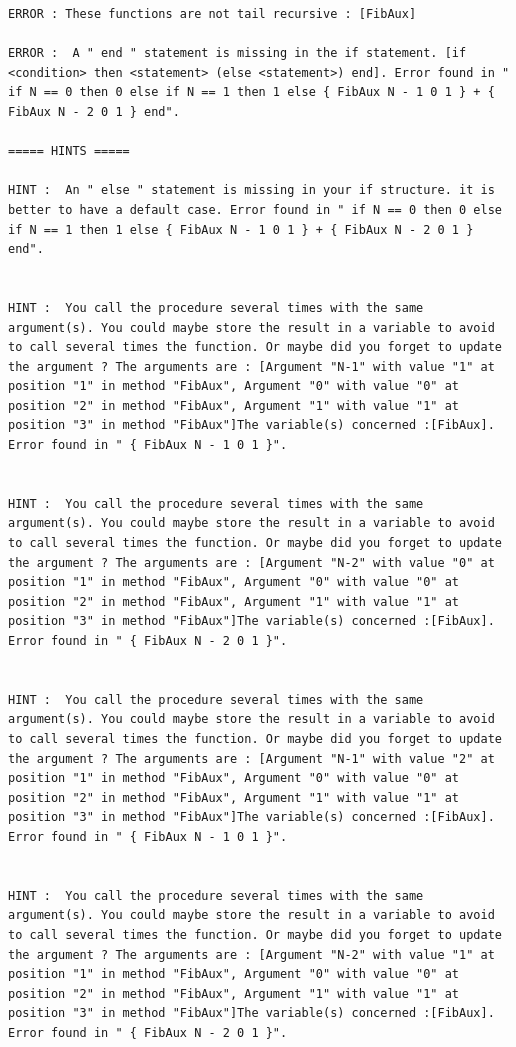 \documentclass[11pt,a4paper,twoside,openright]{report}
\begin{document}
\begin{lstlisting}
ERROR : These functions are not tail recursive : [FibAux]

ERROR :  A " end " statement is missing in the if statement. [if <condition> then <statement> (else <statement>) end]. Error found in " if N == 0 then 0 else if N == 1 then 1 else { FibAux N - 1 0 1 } + { FibAux N - 2 0 1 } end".

===== HINTS =====

HINT :  An " else " statement is missing in your if structure. it is better to have a default case. Error found in " if N == 0 then 0 else if N == 1 then 1 else { FibAux N - 1 0 1 } + { FibAux N - 2 0 1 } end".


HINT :  You call the procedure several times with the same argument(s). You could maybe store the result in a variable to avoid to call several times the function. Or maybe did you forget to update the argument ? The arguments are : [Argument "N-1" with value "1" at position "1" in method "FibAux", Argument "0" with value "0" at position "2" in method "FibAux", Argument "1" with value "1" at position "3" in method "FibAux"]The variable(s) concerned :[FibAux]. Error found in " { FibAux N - 1 0 1 }".


HINT :  You call the procedure several times with the same argument(s). You could maybe store the result in a variable to avoid to call several times the function. Or maybe did you forget to update the argument ? The arguments are : [Argument "N-2" with value "0" at position "1" in method "FibAux", Argument "0" with value "0" at position "2" in method "FibAux", Argument "1" with value "1" at position "3" in method "FibAux"]The variable(s) concerned :[FibAux]. Error found in " { FibAux N - 2 0 1 }".


HINT :  You call the procedure several times with the same argument(s). You could maybe store the result in a variable to avoid to call several times the function. Or maybe did you forget to update the argument ? The arguments are : [Argument "N-1" with value "2" at position "1" in method "FibAux", Argument "0" with value "0" at position "2" in method "FibAux", Argument "1" with value "1" at position "3" in method "FibAux"]The variable(s) concerned :[FibAux]. Error found in " { FibAux N - 1 0 1 }".


HINT :  You call the procedure several times with the same argument(s). You could maybe store the result in a variable to avoid to call several times the function. Or maybe did you forget to update the argument ? The arguments are : [Argument "N-2" with value "1" at position "1" in method "FibAux", Argument "0" with value "0" at position "2" in method "FibAux", Argument "1" with value "1" at position "3" in method "FibAux"]The variable(s) concerned :[FibAux]. Error found in " { FibAux N - 2 0 1 }".



\end{lstlisting}
\end{document}
